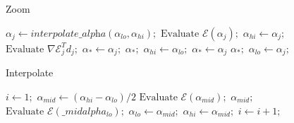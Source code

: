 \begin{algorithm}
\caption{Zoom}\label{zoom}
\begin{algorithmic}[1]
\Repeat 
	\State  $ \alpha_j \gets \textit{interpolate\_alpha}(\alpha_{lo}, \alpha_{hi}); $
	\State $ \text{Evaluate }\mathcal{E}(\alpha_j);$
	\If {$[\mathcal{E}(\alpha_j) > \mathcal{E}(0) + \sigma_1\alpha_j\nabla\mathcal{E}_0^Td_0] \text{  or  } [\mathcal{E}(\alpha_j)\leq \mathcal{E}(\alpha_{lo}) $ }
		\State $\alpha_{hi} \gets \alpha_{j};$
	\Else 
		\State $\text{Evaluate } \nabla\mathcal{E}_j^Td_j; $
			\State $\alpha_* \gets \alpha_j; $
			\Return $\alpha_*; $
		\EndIf
			\State $\alpha_{hi} \gets \alpha_{lo}; $
		\EndIf
			\State $\alpha_* \gets\alpha_{j}$
			\Return $\alpha_*;$
		\EndIf
	\EndIf
	\State $\alpha_{lo} \gets \alpha_{j}; $
\EndRepeat 
\EndProcedure
\end{algorithmic}
\end{algorithm}


\begin{algorithm}
\caption{Interpolate}\label{bisection}
\begin{algorithmic}[1]
\State $i \gets \textit{1};$
	\State $\alpha_{mid} \gets (\alpha_{hi}-\alpha_{lo})/2$
	\State  $ \text{Evaluate }\mathcal{E}(\alpha_{mid});$
			\Return $\alpha_{mid}; $
	\EndIf	
	\State   $\text{Evaluate } \mathcal{E}(\_{mid}alpha_{lo}); $
		\State $\alpha_{lo} \gets \alpha_{mid}; $
	\Else
		\State $\alpha_{hi} \gets \alpha_{mid}; $
	\EndIf
	\State $i \gets i+1; $
\EndWhile
\EndProcedure
\end{algorithmic}
\end{algorithm}


